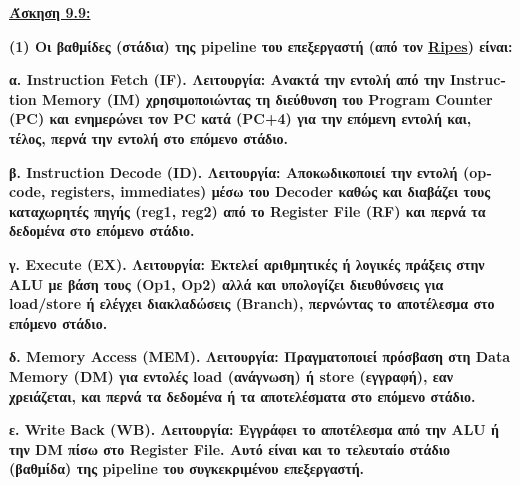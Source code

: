 \documentclass{article}
\begin{document}
\newpage

\begin{center}
\setlength{\fboxrule}{1.1pt}
\setlength{\fboxsep}{7pt}
    \vspace{0.75cm}
\end{center}

\underline{\textbf{Άσκηση 9.9:}}
\vspace{1.75cm}


\textbf{(1)\hspace{0.1cm} Οι βαθμίδες (στάδια) της \textlatin{pipeline} του επεξεργαστή (από τον \href{https://ripes.me/}{\textlatin{Ripes}}) είναι: }

\vspace{0.5cm}

\textbf{α. \textlatin{Instruction Fetch (IF)}. Λειτουργία: Ανακτά την εντολή από την \textlatin{Instruction Memory (IM)} χρησιμοποιώντας τη διεύθυνση του \textlatin{Program Counter (PC)} και ενημερώνει τον \textlatin{PC} κατά \textlatin{(PC+4)} για την επόμενη εντολή και, τέλος, περνά την εντολή στο επόμενο στάδιο.}

\vspace{0.25cm}

\textbf{β. \textlatin{Instruction Decode (ID)}. Λειτουργία: Αποκωδικοποιεί την εντολή \textlatin{(opcode, registers, immediates)} μέσω του \textlatin{Decoder} καθώς και διαβάζει τους καταχωρητές πηγής \textlatin{(reg1, reg2)} από το \textlatin{Register File (RF)} και περνά τα δεδομένα στο επόμενο στάδιο.}

\vspace{0.25cm}

\textbf{γ. \textlatin{Execute (EX)}. Λειτουργία: Εκτελεί αριθμητικές ή λογικές πράξεις στην \textlatin{ALU} με βάση τους \textlatin{(Op1, Op2)} αλλά και υπολογίζει διευθύνσεις για \textlatin{load/store} ή ελέγχει διακλαδώσεις \textlatin{(Branch)}, περνώντας το αποτέλεσμα στο επόμενο στάδιο.}

\vspace{0.25cm}

\textbf{δ. \textlatin{Memory Access (MEM)}. Λειτουργία: Πραγματοποιεί πρόσβαση στη \textlatin{Data Memory (DM)} για εντολές \textlatin{load} (ανάγνωση) ή \textlatin{store} (εγγραφή), εαν χρειάζεται, και περνά τα δεδομένα ή τα αποτελέσματα στο επόμενο στάδιο.}

\vspace{0.25cm}

\textbf{ε. \textlatin{Write Back (WB)}. Λειτουργία: Εγγράφει το αποτέλεσμα από την \textlatin{ALU} ή την \textlatin{DM} πίσω στο \textlatin{Register File}. Αυτό είναι και το τελευταίο στάδιο (βαθμίδα) της \textlatin{pipeline} του συγκεκριμένου επεξεργαστή.}
\end{document}
